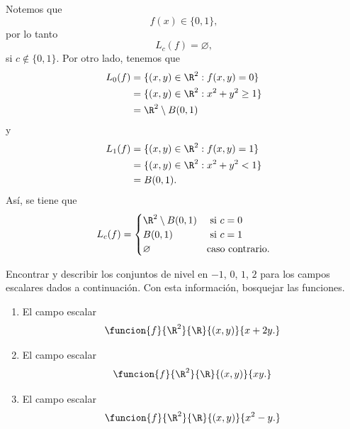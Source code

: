 \documentclass[a4,11pt]{aleph-examen}
\begin{document}
\begin{preguntas}
\begin{respuesta}
    Notemos que
    \[
        f(x)\in \{0,1\},
    \]
    por lo tanto
    \[
        L_c(f)=\varnothing,
    \]
    si $c \not\in \{0,1\}$. Por otro lado, tenemos que
    \begin{align*}
        L_0(f)
            & = \{(x,y)\in\R^2 : f(x,y) = 0\} \\
            & = \{(x,y)\in\R^2 : x^2 + y^2 \geq 1\} \\
            & = \R^2 \setminus B(0,1)
    \end{align*}
    y
    \begin{align*}
        L_1(f)
            & = \{(x,y)\in\R^2 : f(x,y) = 1\} \\
            & = \{(x,y)\in\R^2 : x^2 + y^2 < 1\} \\
            & = B(0,1).
    \end{align*}
    Así, se tiene que
    \[
        L_c(f)=
        \begin{cases}
            \R^2 \setminus B(0,1) & \text{ si } c=0 \\
            B(0,1) & \text{ si } c=1 \\
            \varnothing & \text{caso contrario.}
        \end{cases}
    \]
\end{respuesta}

\item
    Encontrar y describir los conjuntos de nivel en $-1$, $0$, $1$, $2$ para los campos escalares dados a continuación. Con esta información, bosquejar las funciones.
    \begin{enumerate}
    \item
        El campo escalar 
        \[
            \funcion{f}{\R^2}{\R}{(x,y)}{x+2y.}
        \]
            
    \item
        El campo escalar
        \[
            \funcion{f}{\R^2}{\R}{(x,y)}{xy.}
        \]
    
    \item
        El campo escalar
        \[
            \funcion{f}{\R^2}{\R}{(x,y)}{x^2-y.}
        \]
   \end{enumerate}


\end{preguntas}
\end{document}
